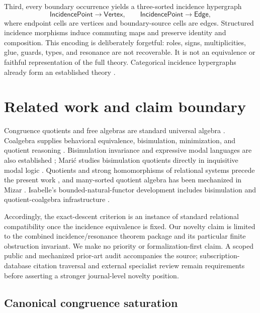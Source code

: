 \documentclass[11pt]{article}
\theoremstyle{definition}
\begin{document}
Third, every boundary occurrence yields a three-sorted incidence hypergraph
\[
\mathsf{IncidencePoint}\longrightarrow\mathsf{Vertex},
\qquad
\mathsf{IncidencePoint}\longrightarrow\mathsf{Edge},
\]
where endpoint cells are vertices and boundary-source cells are edges.
Structured incidence morphisms induce commuting maps and preserve identity and
composition.  This encoding is deliberately forgetful: roles, signs,
multiplicities, glue, guards, types, and resonance are not recoverable.  It is
not an equivalence or faithful representation of the full theory.  Categorical
incidence hypergraphs already form an established theory
\cite{GrillietteRusnak2018}.

\section{Related work and claim boundary}

Congruence quotients and free algebras are standard universal algebra
\cite{BurrisSankappanavar}.  Coalgebra supplies behavioral equivalence,
bisimulation, minimization, and quotient reasoning
\cite{Rutten2000,Staton2011,Wissmann2020,DorschEtAl2017}.  Bisimulation
invariance and expressive modal languages are also established
\cite{BakhtiariHansen2017,BakhtiariEtAl2019}; Mari\'c studies bisimulation
quotients directly in inquisitive modal logic \cite{Maric2025}.  Quotients and
strong homomorphisms of relational systems precede the present work
\cite{Novotny1997,ChajdaLanger2010}, and many-sorted quotient algebra has been
mechanized in Mizar \cite{Korolkiewicz1996}.  Isabelle's bounded-natural-functor
development includes bisimulation and quotient-coalgebra infrastructure
\cite{BNFOperations}.

Accordingly, the exact-descent criterion is an instance of standard relational
compatibility once the incidence equivalence is fixed.  Our novelty claim is
limited to the combined incidence/resonance theorem package and its particular
finite obstruction invariant.  We make no priority or formalization-first
claim.  A scoped public and mechanized prior-art audit accompanies the source;
subscription-database citation traversal and external specialist review remain
requirements before asserting a stronger journal-level novelty position.

\subsection{Canonical congruence saturation}
\end{document}
